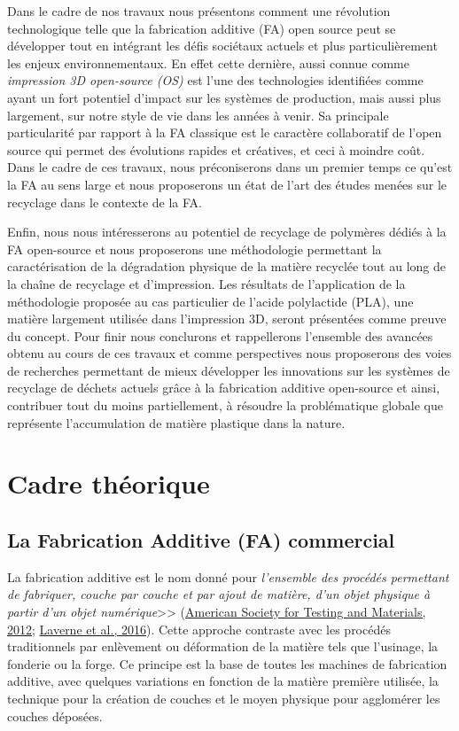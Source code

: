 \documentclass[
]{article}
\begin{document}
Dans le cadre de nos travaux nous présentons comment une révolution technologique telle que la fabrication additive (FA) open source peut se développer tout en intégrant les défis sociétaux actuels et plus particulièrement les enjeux environnementaux. En effet cette dernière, aussi connue comme \emph{impression 3D open-source (OS)} est l'une des technologies identifiées comme ayant un fort potentiel d'impact sur les systèmes de production, mais aussi plus largement, sur notre style de vie dans les années à venir. Sa principale particularité par rapport à la FA classique est le caractère collaboratif de l'open source qui permet des évolutions rapides et créatives, et ceci à moindre coût. Dans le cadre de ces travaux, nous préconiserons dans un premier temps ce qu'est la FA au sens large et nous proposerons un état de l'art des études menées sur le recyclage dans le contexte de la FA.

Enfin, nous nous intéresserons au potentiel de recyclage de polymères dédiés à la FA open-source et nous proposerons une méthodologie permettant la caractérisation de la dégradation physique de la matière recyclée tout au long de la chaîne de recyclage et d'impression.
Les résultats de l'application de la méthodologie proposée au cas particulier de l'acide polylactide (PLA), une matière largement utilisée dans l'impression 3D, seront présentées comme preuve du concept.
Pour finir nous conclurons et rappellerons l'ensemble des avancées obtenu au cours de ces travaux et comme perspectives nous proposerons des voies de recherches permettant de mieux développer les innovations sur les systèmes de recyclage de déchets actuels grâce à la fabrication additive open-source et ainsi, contribuer tout du moins partiellement, à résoudre la problématique globale que représente l'accumulation de matière plastique dans la nature.

\hypertarget{cadre-thuxe9orique}{%
\section{Cadre théorique}\label{cadre-thuxe9orique}}

\hypertarget{la-fabrication-additive-fa-commercial}{%
\subsection{La Fabrication Additive (FA) commercial}\label{la-fabrication-additive-fa-commercial}}

La fabrication additive est le nom donné pour \emph{l'ensemble des procédés permettant de fabriquer, couche par couche et par ajout de matière, d'un objet physique à partir d'un objet numérique}\textgreater\textgreater{} (\protect\hyperlink{ref-ASTM2012}{American Society for Testing and Materials, 2012}; \protect\hyperlink{ref-Laverne2016}{Laverne et al., 2016}).
Cette approche contraste avec les procédés traditionnels par enlèvement ou déformation de la matière tels que l'usinage, la fonderie ou la forge.
Ce principe est la base de toutes les machines de fabrication additive, avec quelques variations en fonction de la matière première utilisée, la technique pour la création de couches et le moyen physique pour agglomérer les couches déposées.
\end{document}
